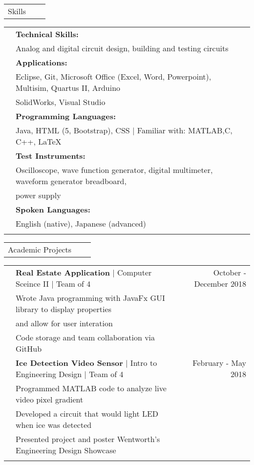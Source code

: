 \documentclass[letterpaper,10pt,oneside]{article}
\begin{document}
 \noindent \begin{tabularx}{\linewidth}{@{} l l R } 
     \Large{Skills}\\
 \end{tabularx}
 \noindent \begin{tabularx}{\linewidth}{@{} l l l }
 	 &\textbf{Technical Skills:}\\
 	 &Analog and digital circuit design, building and testing circuits\\
     &\textbf{Applications:}\\
     &Eclipse, Git, Microsoft Office (Excel, Word, Powerpoint), Multisim, Quartus II, Arduino\\
     &SolidWorks, Visual Studio\\
     &\textbf{Programming Languages:}\\
     &Java, HTML (5, Bootstrap), CSS $\mid$ Familiar with: MATLAB,C,  C++, \LaTeX  \\
     &\textbf{Test Instruments:}\\
     &Oscilloscope, wave function generator, digital multimeter, waveform generator breadboard,\\
     &power supply\\
     &\textbf{Spoken Languages:}\\
     &English (native), Japanese (advanced) \\
     \\
 \end{tabularx}

 \noindent \begin{tabularx}{\linewidth}{@{} l l R } 
     \Large{Academic Projects}\\
 \end{tabularx}
 \noindent \begin{tabularx}{\linewidth}{@{} l l R }     
     & \textbf{Real Estate Application} $\mid$ Computer Sceince II $\mid$ Team of 4 & October - December 2018 \\
     &Wrote Java programming with JavaFx GUI library to display properties\\
     &and allow for user interation\\
     &Code storage and team collaboration via GitHub\\
     & \textbf{Ice Detection Video Sensor} $\mid$ Intro to Engineering Design $\mid$ Team of 4 & February - May 2018 \\
     &Programmed MATLAB code to analyze live video pixel gradient\\
     &Developed a circuit that would light LED when ice was detected\\
     &Presented project and poster Wentworth's Engineering Design Showcase\\
     \\
\end{tabularx}
\end{document}
